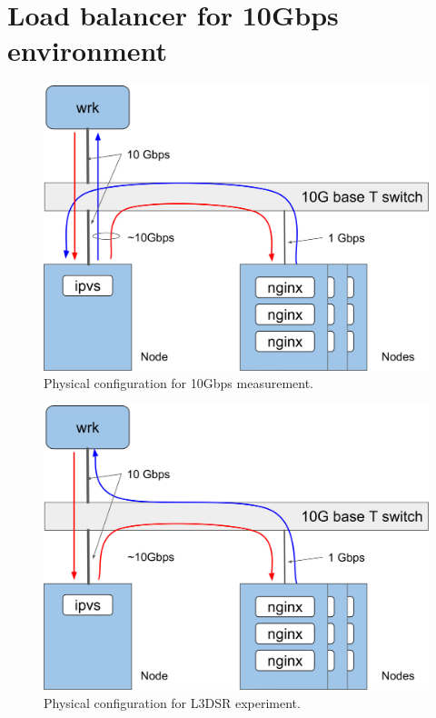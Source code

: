 \FloatBarrier

\section{Load balancer for 10Gbps environment}

\begin{figure}[h]
  \centering
  \includegraphics[width=0.8\columnwidth]{Figs/bench_10g}
  \caption{Physical configuration for 10Gbps measurement.}
  \label{fig:bench_10g}
\end{figure}

\begin{figure}[h]
  \centering
  \includegraphics[width=0.8\columnwidth]{Figs/bench_10g_l3dsr}
  \caption{Physical configuration for L3DSR experiment.}
  \label{fig:bench_10g_l3dsr}
\end{figure}


